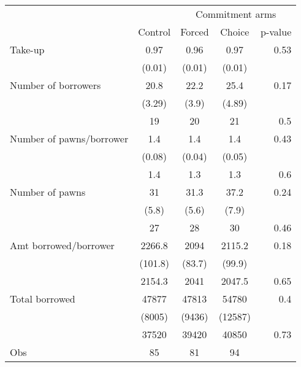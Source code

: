 \begin{tabular}{lcccr}
\toprule
      &       & \multicolumn{3}{c}{Commitment arms} \\
\cmidrule{3-5}        & Control & Forced & Choice & \multicolumn{1}{c}{p-value} \\
\midrule
\midrule
Take-up & 0.97  & 0.96  & 0.97  & 0.53 \\
      & (0.01) & (0.01) & (0.01) &  \\
\midrule
Number of borrowers & 20.8  & 22.2  & 25.4  & 0.17 \\
      & (3.29) & (3.9) & (4.89) &  \\
\rowcolor[rgb]{ .949,  .949,  .949} \multicolumn{1}{r}{median} & 19    & 20    & 21    & 0.5 \\
\midrule
Number of pawns/borrower & 1.4   & 1.4   & 1.4   & 0.43 \\
      & (0.08) & (0.04) & (0.05) &  \\
\rowcolor[rgb]{ .949,  .949,  .949} \multicolumn{1}{r}{median} & 1.4   & 1.3   & 1.3   & 0.6 \\
\midrule
Number of pawns  & 31    & 31.3  & 37.2  & 0.24 \\
      & (5.8) & (5.6) & (7.9) &  \\
\rowcolor[rgb]{ .949,  .949,  .949} \multicolumn{1}{r}{median} & 27    & 28    & 30    & 0.46 \\
\midrule
Amt borrowed/borrower & 2266.8 & 2094  & 2115.2 & 0.18 \\
      & (101.8) & (83.7) & (99.9) &  \\
\rowcolor[rgb]{ .949,  .949,  .949} \multicolumn{1}{r}{median} & 2154.3 & 2041  & 2047.5 & 0.65 \\
\midrule
Total borrowed & 47877 & 47813 & 54780 & 0.4 \\
      & (8005) & (9436) & (12587) &  \\
\rowcolor[rgb]{ .949,  .949,  .949} \multicolumn{1}{r}{median} & 37520 & 39420 & 40850 & 0.73 \\
\midrule
Obs   & 85    & 81    & 94    &  \\
\bottomrule
\bottomrule
\end{tabular}%
